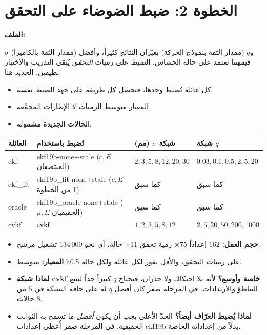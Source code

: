 \documentclass[11pt,a4paper]{article}
\newcommand{\en}[1]{\textenglish{#1}}
\newcommand{\code}[1]{\LR{\texttt{#1}}}
\begin{document}
\section{الخطوة 2: ضبط الضوضاء على التحقق}
\noindent\textbf{الملف:} \code{step\_0i\_tune\_ekf\_noise.py}\par\medskip
\begin{why}[الغرض]
$\sigma$ (مقدار الثقة بالكاميرا) و$q$ (مقدار الثقة بنموذج الحركة) يغيّران النتائج كثيراً، وأفضل قيمهما تعتمد على حالة الحساس.
الضبط على رميات \emph{التحقق} يُبقي التدريب والاختبار نظيفين. الجديد هنا:
\begin{itemize}
\item كل عائلة تُضبط وحدها، فتحصل كل طريقة على جهد الضبط نفسه.
\item المعيار متوسط الرميات لا الإطارات المجمَّعة.
\item الحالات الجديدة مشمولة.
\end{itemize}
\end{why}
\begin{center}\small
\begin{tabularx}{\linewidth}{@{}l>{\raggedleft\arraybackslash}Xll@{}}\toprule
العائلة & تُضبط باستخدام & شبكة $\sigma$ (مم) & شبكة $q$\\\midrule
\en{ekf} & \en{ekf19b-none+stale} ($c,E$ المنتصفان) & $2,3,5,8,12,20,30$ & $0.03,0.1,0.5,2,5,20$\\
\en{ekf\_fit} & \en{ekf19b\_fit-none+stale} ($c,E$ من الخطوة $1$) & كما سبق & كما سبق\\
\en{oracle} & \en{ekf19b\_oracle-none+stale} ($\mu,E$ الحقيقيان) & كما سبق & كما سبق\\
\en{cvkf} & \en{cvkf} & $1,2,3,5,8,12$ & $2,5,20,50,200,1000$\\\bottomrule
\end{tabularx}\end{center}
\begin{itemize}
\item \textbf{حجم العمل:} $162$ إعداداً $\times75$ رمية تحقق $\times11$ حالة، أي نحو $134\,000$ تشغيل مرشح.
\item \textbf{المعيار:} متوسط \en{h0.5} على رميات التحقق، والأقل يفوز لكل عائلة ولكل حالة.
\item \textbf{لماذا شبكة \en{cvkf} خاصة وأوسع؟} لأنه بلا احتكاك ولا جدران، فيحتاج $q$ كبيراً جداً ليتبع التباطؤ والارتدادات.
في المرحلة صفر كان أفضل $q$ له على حافة الشبكة في $5$ من $8$ حالات.
\item \textbf{لماذا يُضبط العرّاف أيضاً؟} الحدّ الأعلى يجب أن يكون \emph{أفضل} ما تسمح به الثوابت الحقيقية. في المرحلة صفر أُعطي
إعدادات \en{ekf19b} بدلاً من إعداداته الخاصة.
\end{itemize}
\end{document}
